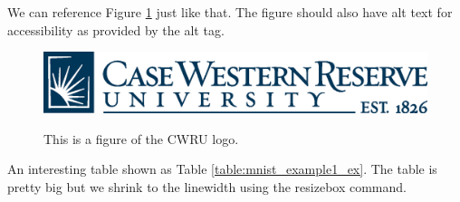 \documentclass[12pt, oneside]{book}
\begin{document}

We can reference Figure \ref{fig:logo} just like that. The figure should also
have alt text for accessibility as provided by the alt tag.

\begin{figure}[hbt!]
    \centering
    \includegraphics[width=.5\textwidth,alt={This is alt text for a figure of the CWRU logo.}]{cwru_logo.eps}
    \caption{This is a figure of the CWRU logo.}
    \label{fig:logo}
\end{figure}

\lipsum[1]

An interesting table shown as Table \ref{table:mnist_example1_ex}. The table is
pretty big but we shrink to the linewidth using the resizebox command.
\end{document}
